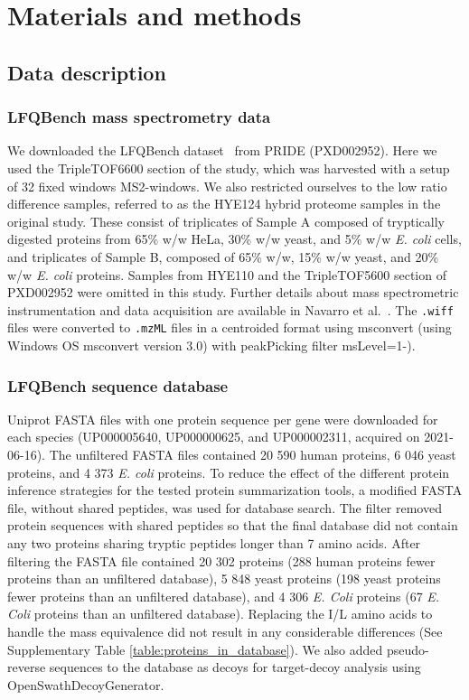 \documentclass[10pt,letterpaper]{article}
\begin{document}
 
\section*{Materials and methods}


\subsection*{Data description}
\subsubsection*{LFQBench mass spectrometry data}


We downloaded the LFQBench dataset~\cite{navarro2016multicenter} from PRIDE (PXD002952). Here we used the TripleTOF6600 section of the study, which was harvested with a setup of 32 fixed windows MS2-windows. We also restricted ourselves to the low ratio difference samples, referred to as the HYE124 hybrid proteome samples in the original study. These consist of triplicates of Sample A composed of tryptically digested proteins from 65\% w/w HeLa, 30\% w/w yeast, and 5\% w/w \textit{E. coli} cells, and triplicates of Sample B, composed of 65\% w/w, 15\% w/w yeast, and 20\% w/w \textit{E. coli} proteins. Samples from HYE110 and the TripleTOF5600 section of PXD002952 were omitted in this study. Further details about mass spectrometric instrumentation and data acquisition are available in Navarro et al.~\cite{navarro2016multicenter}. The \verb|.wiff| files were converted to \verb|.mzML| files in a centroided format using msconvert (using Windows OS msconvert version 3.0) with peakPicking filter msLevel=1-). 


\subsubsection*{LFQBench sequence database}

Uniprot FASTA files with one protein sequence per gene were downloaded for each species (UP000005640, UP000000625, and UP000002311, acquired on 2021-06-16). The unfiltered FASTA files contained 20 590 human proteins, 6 046 yeast proteins, and 4 373 \textit{E. coli} proteins. To reduce the effect of the different protein inference strategies for the tested protein summarization tools, a modified FASTA file, without shared peptides, was used for database search. The filter removed protein sequences with shared peptides so that the final database did not contain any two proteins sharing tryptic peptides longer than 7 amino acids. After filtering the FASTA file contained 20 302 proteins (288 human proteins fewer proteins than an unfiltered database), 5 848 yeast proteins (198 yeast proteins fewer proteins than an unfiltered database), and 4 306 \textit{E. Coli} proteins (67 \textit{E. Coli} proteins than an unfiltered database). Replacing the I/L amino acids to handle the mass equivalence did not result in any considerable differences (See Supplementary Table \ref{table:proteins_in_database}). We also added pseudo-reverse sequences to the database as decoys for target-decoy analysis using OpenSwathDecoyGenerator. 
\end{document}
